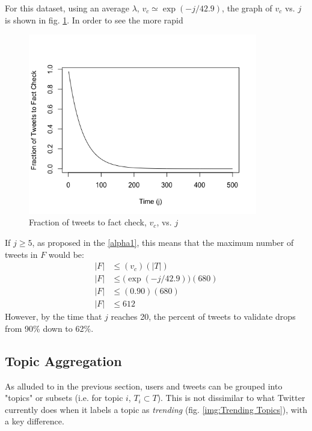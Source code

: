 \documentclass[preprint,review,12pt]{elsarticle}
\begin{document}
For this dataset, using an average $\lambda$, $v_c \simeq \exp(-j/42.9)$, the graph of $v_c$ vs. $j$ is shown in fig. \ref{fig:v_c exp(-x/42.9)}. In order to see the more rapid 
\begin{figure}[h]
 \centering
  \includegraphics[width=10cm]{v_c e to the -x42.9.png}
  \caption{Fraction of tweets to fact check, $v_c$, vs. $j$}\label{fig:v_c exp(-x/42.9)}
 \end{figure}
 
 If $j \geq 5$, as proposed in the \ref{alpha1}, this means that the maximum number of tweets in $F$ would be:
\[
 \begin{split}
 |F| & \leq (v_c)(|T|) \\
  |F| & \leq \big(\exp(-j/42.9)\big)(680) \\
 |F| & \leq (0.90)(680) \\
  |F| & \leq612
 \end{split}
\]
However, by the time that $j$ reaches 20, the percent of tweets to validate drops from 90\% down to 62\%. 

\subsection{Topic Aggregation}
As alluded to in the previous section, users and tweets can be grouped into "topics" or subsets (i.e.  for topic $i$, $T_i \subset T$). This is not dissimilar to what Twitter currently does when it labels a topic as \textit{trending} (fig. \ref{img:Trending Topics}), with a key difference. 
\end{document}
